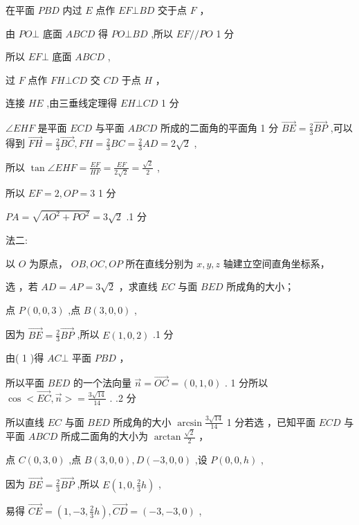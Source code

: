 \documentclass[10pt]{article}
\newcommand*\circled[1]{\tikz[baseline=(char.base)]{\node[shape=circle,draw,inner sep=1.5pt] (char) {\small #1};}}
\begin{document}
在平面 \({PBD}\) 内过 \(E\) 点作 \({EF} \bot  {BD}\) 交于点 \(F\) ，

由 \({PO} \bot\) 底面 \({ABCD}\) 得 \({PO} \bot  {BD}\) ,所以 \({EF}//{PO}\) 1 分

所以 \({EF} \bot\) 底面 \({ABCD}\) ,

过 \(F\) 点作 \({FH} \bot  {CD}\) 交 \({CD}\) 于点 \(H\) ，

连接 \({HE}\) ,由三垂线定理得 \({EH} \bot  {CD}\) 1 分

\(\angle {EHF}\) 是平面 \({ECD}\) 与平面 \({ABCD}\) 所成的二面角的平面角 1 分 \(\overrightarrow{BE} = \frac{2}{3}\overrightarrow{BP}\) ,可以得到 \(\overrightarrow{FH} = \frac{2}{3}\overrightarrow{BC},{FH} = \frac{2}{3}{BC} = \frac{2}{3}{AD} = 2\sqrt{2}\) ,

所以 \(\tan \angle {EHF} = \frac{EF}{HF} = \frac{EF}{2\sqrt{2}} = \frac{\sqrt{2}}{2}\) ,

所以 \({EF} = 2,{OP} = 3\) 1 分

\({PA} = \sqrt{A{O}^{2} + P{O}^{2}} = 3\sqrt{2}\) .1 分

法二:

以 \(O\) 为原点， \({OB},{OC},{OP}\) 所在直线分别为 \(x,y,z\) 轴建立空间直角坐标系，

选 \circled{1} ，若 \({AD} = {AP} = 3\sqrt{2}\) ，求直线 \({EC}\) 与面 \({BED}\) 所成角的大小；

点 \(P\left( {0,0,3}\right)\) ,点 \(B\left( {3,0,0}\right)\) ,

因为 \(\overrightarrow{BE} = \frac{2}{3}\overrightarrow{BP}\) ,所以 \(E\left( {1,0,2}\right)\) .1 分

由( 1 )得 \({AC}\bot\) 平面 \({PBD}\) ，

所以平面 \({BED}\) 的一个法向量 \(\overrightarrow{n} = \overrightarrow{OC} = \left( {0,1,0}\right)\) . 1 分所以 \(\cos  < \overrightarrow{EC},\overrightarrow{n} >  = \frac{3\sqrt{14}}{14}\) . .2 分

所以直线 \({EC}\) 与面 \({BED}\) 所成角的大小 \(\arcsin \frac{3\sqrt{14}}{14}\) 1 分若选 \circled{2} ，已知平面 \({ECD}\) 与平面 \({ABCD}\) 所成二面角的大小为 \(\arctan \frac{\sqrt{2}}{2}\) ，

点 \(C\left( {0,3,0}\right)\) ,点 \(B\left( {3,0,0}\right) ,D\left( {-3,0,0}\right)\) ,设 \(P\left( {0,0,h}\right)\) ,

因为 \(\overrightarrow{BE} = \frac{2}{3}\overrightarrow{BP}\) ,所以 \(E\left( {1,0,\frac{2}{3}h}\right)\) ,

易得 \(\overrightarrow{CE} = \left( {1, - 3,\frac{2}{3}h}\right) ,\overrightarrow{CD} = \left( {-3, - 3,0}\right)\) ,
\end{document}
